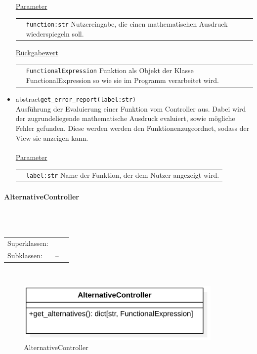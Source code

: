 \documentclass{article}
\newcommand{\classheader}[2][]{\paragraph{#2}
\mbox{}\textit{#1}\\\\}
\newcommand{\classref}[1]{\texttt{\nameref{cls:#1}}}
\begin{document}
\begin{itemize}
\underline{{Parameter}}\\
\begin{tabular}{lp{10.7cm}}
 & \texttt{function:str}  Nutzereingabe, die einen mathematischen Ausdruck wiederspiegeln soll. \\
\end{tabular}
\newline\newline
\underline{{Rückgabewert}}\\
\begin{tabular}{lp{10.7cm}}
 & \texttt{FunctionalExpression} Funktion als Objekt der Klasse FunctionalExpression so wie sie im Programm verarbeitet wird. \\
\end{tabular}


\item \flqq{}abstract\frqq \texttt{get\_error\_report(label:str)}\\ Ausführung der Evaluierung einer Funktion vom Controller aus. Dabei wird der zugrundeliegende mathematische Ausdruck evaluiert, sowie mögliche Fehler gefunden. Diese werden werden den Funktionenzugeordnet, sodass der View sie anzeigen kann. \\\\
\underline{{Parameter}}\\
\begin{tabular}{lp{10.7cm}}
 & \texttt{label:str} Name der Funktion, der dem Nutzer angezeigt wird. \\
\end{tabular}
\end{itemize}


\newpage
\classheader{AlternativeController}\label{cls:AlternativeController}
\begin{tabular}{lll}
 Superklassen: & \classref{FunctionController}\\
 Subklassen: & --
\end{tabular}\\
\begin{figure}[H]%
    \centering
    \includegraphics[width=10cm]{entwurf/Floriane/AlternativeController.png}
    \caption{AlternativeController}
\end{figure}
\end{document}
